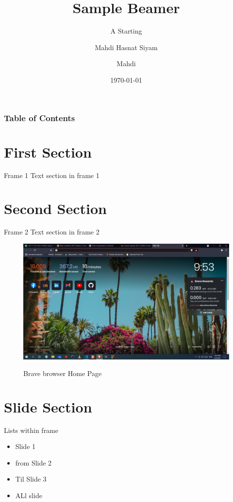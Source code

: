\documentclass{beamer}
\title{Sample Beamer}
\subtitle{A Starting}
\author{Mahdi Hasnat Siyam}
\author[mahdi]{Mahdi }
\institute[CSE,BUET]{BUET BUET BUET}
\date{\today}
\begin{document}
	\frame{\titlepage}	

	\begin{frame}
		\frametitle{Table of Contents}
		\tableofcontents
	\end{frame}

	\section{First Section }

	\begin{frame}{Frame 1}
		Text section in frame 1
	\end{frame}

	\section{Second Section}
	\begin{frame}{Frame 2}
		Text section in frame 2
		\begin{figure}[h]
			\centering
			\caption{Brave browser Home Page}
			\includegraphics[scale = 0.1]{fig1.png}
			\label{fig:1}
		\end{figure}
	\end{frame}

	\section{Slide Section}
	\begin{frame}{Lists within frame}
		\begin{itemize}
			\item<2> Slide 1
			\item<2-> from Slide 2
			\item<-3> Til Slide 3
			\item<1-4> ALl slide
		\end{itemize}
	\end{frame}
\end{document}
